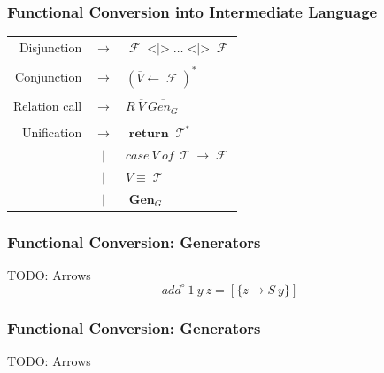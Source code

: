 \documentclass[xcolor=table, aspectratio=169]{beamer}
\DeclareMathOperator{\Term}{\mathcal{T}}
\DeclareMathOperator{\Fun}{\mathcal{F}}
\DeclareMathOperator{\Rtrn}{\mathbf{return}}
\DeclareMathOperator{\Sum}{\mathbf{<|>}}
\DeclareMathOperator{\Gen}{\mathbf{Gen}}
\newcommand{\LIST}[1]{ #1^*}
\begin{document}
\begin{frame}[fragile]
  \frametitle{Functional Conversion into Intermediate Language}
\begin{center}
\begin{tabular}{rcl}
  Disjunction   & $\rightarrow$ & $\Fun \Sum \ldots \Sum \Fun$ \\ && \\
  Conjunction   & $\rightarrow$ & $ \LIST{\left(\overline{V} \leftarrow \Fun\right)}$ \\ && \\
  Relation call & $\rightarrow$ & $ R\ \overline{V}\ \overline{Gen_{G}}$ \\ && \\
  Unification   & $\rightarrow$ & $\Rtrn \LIST{\Term}$ \\
                & $|$           & $case\ V\ of\ \Term \to \Fun$ \\
                & $|$           & $V \equiv \Term$ \\
                & $|$           & $\Gen_{G}$
\end{tabular}
\end{center}
\end{frame}


\begin{frame}[fragile]
  \frametitle{Functional Conversion: Generators}






TODO: Arrows
\[ add^{\circ}\ 1\ y\ z = \left[\{z \to S\ y\} \right] \] 
\end{frame}

\begin{frame}[fragile]
  \frametitle{Functional Conversion: Generators}



    
    TODO: Arrows
\end{frame}
\end{document}
